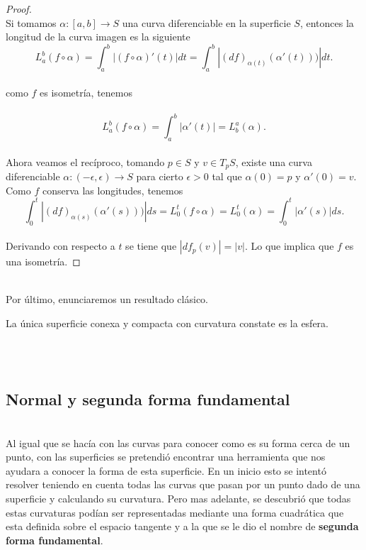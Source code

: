 \begin{proof}
	${}$\\
	
	Si tomamos $\alpha : [a,b] \to S$ una curva diferenciable en la superficie $S$, entonces la longitud de la curva imagen es la siguiente
	${}$\\
	\[
	L^{b}_{a} (f \circ \alpha) = \int^{b}_{a} |(f \circ \alpha)'(t)| dt = \int^{b}_{a} |(df)_{\alpha(t)}(\alpha'(t)))| dt.
	\]
	${}$\\
	como $f$ es isometría, tenemos\\
	${}$\\
	\[
	L^{b}_{a} (f \circ \alpha) = \int^{b}_{a} |\alpha'(t)| = L^{a}_{b} (\alpha).
	\]
	${}$\\
	
	Ahora veamos el recíproco, tomando $p \in S$ y $v \in T_p S$, existe una curva diferenciable $\alpha : (-\epsilon, \epsilon) \to S$ para cierto $\epsilon > 0$ tal que $\alpha(0) = p$ y $\alpha'(0) = v$. Como $f$ conserva las longitudes, tenemos
	${}$\\
	\[
	\int^{t}_{0}|(df)_{\alpha(s)}(\alpha'(s)))| ds = L^{t}_{0} (f \circ \alpha) = L^{t}_{0}(\alpha) = \int^{t}_{0} |\alpha'(s)|ds.
	\]
	${}$\\
	Derivando con respecto a $t$ se tiene que $|df_p(v)|=|v|$. Lo que implica que $f$ es una isometría.
	
\end{proof}
${ }$\\

Por último, enunciaremos un resultado clásico.
${ }$\\

\begin{teorema} \label{teo:hil-lie}
	La única superficie conexa y compacta con curvatura constate es la esfera.
\end{teorema}
${ }$\\



${ }$\\
\subsection{Normal y segunda forma fundamental}
${ }$\\

Al igual que se hacía con las curvas para conocer como es su forma cerca de un punto, con las superficies se pretendió encontrar una herramienta que nos ayudara a conocer la forma de esta superficie. En un inicio esto se intentó resolver teniendo en cuenta todas las curvas que pasan por un punto dado de una superficie y calculando su curvatura. Pero mas adelante, se descubrió que todas estas curvaturas podían ser representadas mediante una forma cuadrática que esta definida sobre el espacio tangente y a la que se le dio el nombre de \textbf{segunda forma fundamental}.
${ }$\\

